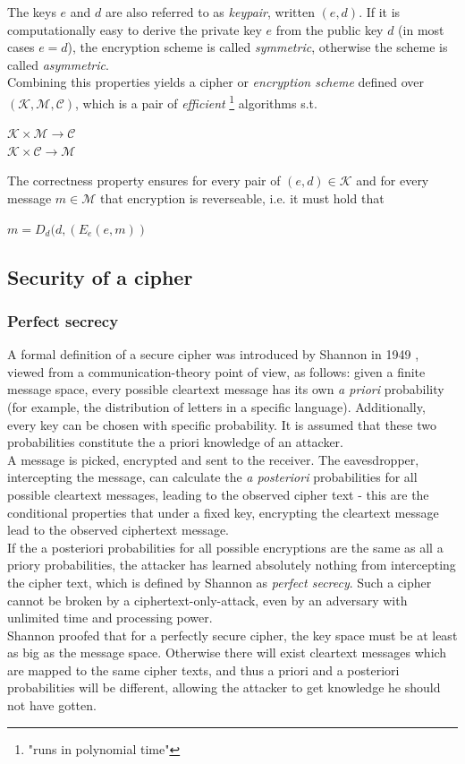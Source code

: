The keys $e$ and $d$ are also referred to as \textit{keypair}, written $(e,d)$. 
If it is computationally easy to derive the private key $e$ from the public key $d$ (in most cases $e = d$), the encryption scheme
is called \textit{symmetric}, otherwise the scheme is called \textit{asymmetric}.
\\
Combining this properties yields a cipher or \textit{encryption scheme} defined over $\mathcal{(K,M,C)}$, which is a pair of \textit{efficient}
 \footnote{"runs in polynomial time"} algorithms s.t.
 \begin{center}
   $\mathcal{K} \times \mathcal{M} \rightarrow \mathcal{C}$
   \\
   $\mathcal{K} \times \mathcal{C} \rightarrow \mathcal{M}$
 \end{center}
 The correctness property ensures for every pair of $(e,d) \in \mathcal{K}$ and for every message $m \in \mathcal{M}$ that encryption is reverseable, i.e. 
 it must hold that 
 \begin{center}  
 $ m = D_d(d, (E_e(e, m))$
  \end{center}

\subsection{Security of a cipher}

\subsubsection{Perfect secrecy}

A formal definition of a secure cipher was introduced by Shannon in 1949 \cite{6769090}, viewed from a communication-theory point of view, as follows:
given a finite message space, every possible cleartext message has its own \textit{a priori} probability (for example, the distribution of letters in a 
specific language). Additionally, every key can be chosen with specific probability. It is assumed that these
two probabilities constitute the a priori knowledge of an attacker.
\\
A message is picked, encrypted
and sent to the receiver. The eavesdropper, intercepting the message, can calculate the \textit{a posteriori} probabilities for all possible cleartext messages, 
leading to the observed cipher text - this are the conditional properties that under a fixed key, encrypting the cleartext message lead to the
observed ciphertext message.
\\
If the a posteriori probabilities for all possible encryptions are the same as all a priory probabilities, the attacker has learned absolutely
nothing from intercepting the cipher text, which is defined by Shannon as \textit{perfect secrecy}. Such a cipher cannot be broken by a ciphertext-only-attack,
even by an adversary with unlimited time and processing power.
\\
Shannon proofed that for a perfectly secure cipher, the key space must be at least as big as the message space.
Otherwise there will exist cleartext messages which are mapped to the same cipher texts, and thus a priori and a posteriori probabilities will be different,
allowing the attacker to get knowledge he should not have gotten. 

